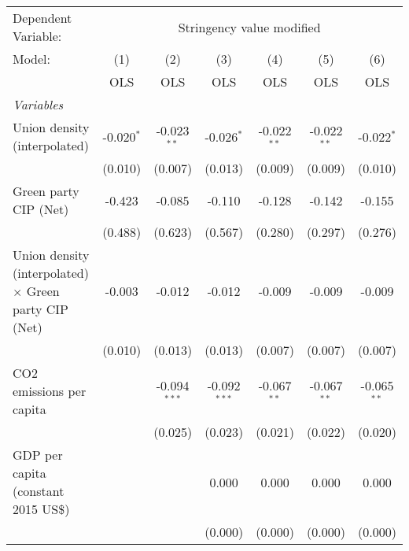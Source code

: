 
\begingroup
\centering
\begin{tabular}{lcccccc}
   \toprule
   Dependent Variable: & \multicolumn{6}{c}{Stringency value modified}\\
   Model:                                                       & (1)          & (2)            & (3)            & (4)           & (5)           & (6)\\  
                                                                &  OLS         & OLS            & OLS            & OLS           & OLS           & OLS\\  
   \midrule
   \emph{Variables}\\
   Union density (interpolated)                                 & -0.020$^{*}$ & -0.023$^{**}$  & -0.026$^{*}$   & -0.022$^{**}$ & -0.022$^{**}$ & -0.022$^{*}$\\   
                                                                & (0.010)      & (0.007)        & (0.013)        & (0.009)       & (0.009)       & (0.010)\\   
   Green party CIP (Net)                                        & -0.423       & -0.085         & -0.110         & -0.128        & -0.142        & -0.155\\   
                                                                & (0.488)      & (0.623)        & (0.567)        & (0.280)       & (0.297)       & (0.276)\\   
   Union density (interpolated) $\times$ Green party CIP (Net)  & -0.003       & -0.012         & -0.012         & -0.009        & -0.009        & -0.009\\   
                                                                & (0.010)      & (0.013)        & (0.013)        & (0.007)       & (0.007)       & (0.007)\\   
   CO2 emissions per capita                                     &              & -0.094$^{***}$ & -0.092$^{***}$ & -0.067$^{**}$ & -0.067$^{**}$ & -0.065$^{**}$\\   
                                                                &              & (0.025)        & (0.023)        & (0.021)       & (0.022)       & (0.020)\\   
   GDP per capita (constant 2015 US\$)                          &              &                & 0.000          & 0.000         & 0.000         & 0.000\\   
                                                                &              &                & (0.000)        & (0.000)       & (0.000)       & (0.000)\\   

\end{tabular}
